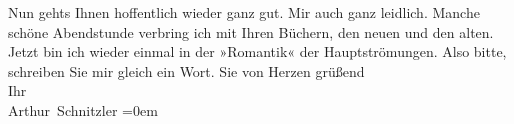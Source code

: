\begin{ledgroupsized}[t]{13cm}
                    Nun gehts Ihnen hoffentlich wieder ganz gut. Mir auch ganz leidlich. Manche  schöne Abendstunde verbring ich mit Ihren
                    Büchern, den neuen und den alten. Jetzt bin ich wieder einmal in der »Romantik«
                    der Hauptströmungen.\pend
           \pstart
           Also bitte, schreiben Sie mir gleich ein Wort.\pend
           \pstart
           Sie von Herzen grüßend{\\[\baselineskip]}Ihr{\\[\baselineskip]}\spacefill\mbox{Arthur Schnitzler}\pend
           \leftskip=0em{}\endnumbering{}\end{ledgroupsized}  \newcommand{\dateiname}{L02432}\newcommand{\titel}{Arthur Schnitzler an Georg Brandes, 11. 2. 1925}\newcommand{\editorInnen}{Martin Anton Müller und Gerd-Hermann Susen}
      